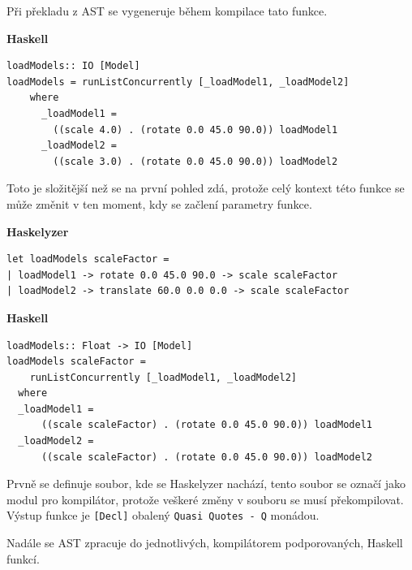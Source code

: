 \documentclass[male,czech]{kithesis}
\newcommand{\haskellInline}[1]{\colorbox{gray!10}{\texttt{#1}}}
\begin{document}
Při překladu z AST se vygeneruje během kompilace tato funkce.

\textbf{Haskell}
\begin{verbatim}
loadModels:: IO [Model]
loadModels = runListConcurrently [_loadModel1, _loadModel2] 
    where 
      _loadModel1 = 
        ((scale 4.0) . (rotate 0.0 45.0 90.0)) loadModel1
      _loadModel2 = 
        ((scale 3.0) . (rotate 0.0 45.0 90.0)) loadModel2
\end{verbatim}

Toto je složitější než se na první pohled zdá,
protože celý kontext této funkce se může změnit v ten moment,
kdy se začlení parametry funkce.

\textbf{Haskelyzer}
\begin{verbatim}
let loadModels scaleFactor =
| loadModel1 -> rotate 0.0 45.0 90.0 -> scale scaleFactor 
| loadModel2 -> translate 60.0 0.0 0.0 -> scale scaleFactor 
\end{verbatim}

\textbf{Haskell}
\begin{verbatim}
loadModels:: Float -> IO [Model]
loadModels scaleFactor = 
    runListConcurrently [_loadModel1, _loadModel2] 
  where 
  _loadModel1 = 
      ((scale scaleFactor) . (rotate 0.0 45.0 90.0)) loadModel1 
  _loadModel2 = 
      ((scale scaleFactor) . (rotate 0.0 45.0 90.0)) loadModel2 
\end{verbatim}

Prvně se definuje soubor, 
kde se Haskelyzer nachází,
tento soubor se označí jako modul pro kompilátor,
protože veškeré změny v souboru se musí překompilovat. 
Výstup funkce je \haskellInline{[Decl]} obalený 
\haskellInline{Quasi Quotes - Q} monádou.

Nadále se AST zpracuje do jednotlivých, 
kompilátorem podporovaných, 
Haskell funkcí.
\end{document}

